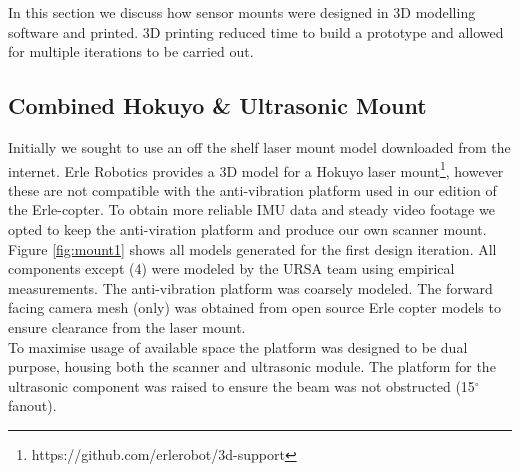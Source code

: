 \documentclass[capstone_report.tex]{subfiles}
\begin{document}
In this section we discuss how sensor mounts were designed in 3D modelling software and printed. 3D printing reduced time to build a prototype and allowed for multiple iterations to be carried out.

\subsection{Combined Hokuyo \& Ultrasonic Mount}
Initially we sought to use an off the shelf laser mount model downloaded from the internet. Erle Robotics provides a 3D model for a Hokuyo laser mount\footnote{https://github.com/erlerobot/3d-support}, however these are not compatible with the anti-vibration platform used in our edition of the Erle-copter. To obtain more reliable IMU data and steady video footage we opted to keep the anti-viration platform and produce our own scanner mount.\\

Figure \ref{fig:mount1} shows all models generated for the first design iteration.  All components except (4) were modeled by the URSA team using empirical measurements. The anti-vibration platform was coarsely modeled. The forward facing camera mesh (only) was obtained from open source Erle copter models \cite{erle_camera_case} to ensure clearance from the laser mount.\\

To maximise usage of available space the platform was designed to be dual purpose, housing both the scanner and ultrasonic module.  The platform for the ultrasonic component was raised to ensure the beam was not obstructed (15$^\circ$ fanout).
\end{document}
